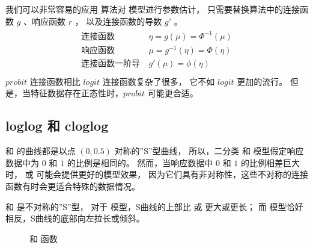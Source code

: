 \documentclass[letterpaper,10pt,english]{sphinxmanual}
\begin{document}
我们可以非常容易的应用  算法对  模型进行参数估计，
只需要替换算法中的连接函数 \(g\) 、响应函数 \(r\) ，
以及连接函数的导数 \(g'\) 。
\begin{align}\label{equation:二项模型/content:二项模型/content:46}\!\begin{aligned}
\text{连接函数} &\ \eta = g(\mu) = \Phi^{-1}(\mu)\\
\text{响应函数} &\ \mu = g^{-1}(\eta) = \Phi(\eta)\\
\text{连接函数一阶导} &\ g'(\mu) = \phi(\eta)\\
\end{aligned}\end{align}
\(probit\) 连接函数相比 \(logit\) 连接函数复杂了很多，
它不如 \(logit\) 更加的流行。
但是，当特征数据存在正态性时，\(probit\) 可能更合适。


\subsection{log\sphinxhyphen{}log 和 clog\sphinxhyphen{}log}
\label{\detokenize{_u4e8c_u9879_u6a21_u578b/content:log-log-clog-log}}
 和  的曲线都是以点 \((0,0.5)\) 对称的”S”型曲线，
所以，二分类  和  模型假定响应数据中为 \(0\) 和 \(1\) 的比例是相同的。
然而，当响应数据中 \(0\) 和 \(1\) 的比例相差巨大时，
 或  可能会提供更好的模型效果，
因为它们具有非对称性，这些不对称的连接函数有时会更适合特殊的数据情况。

 和  是不对称的”S”型，
对于  模型，S曲线的上部比  或  更大或更长；
而  模型恰好相反，S曲线的底部向左拉长或倾斜。

\begin{figure}[htbp]
\centering
\capstart

\noindent{}
\caption{ 和  函数}\label{\detokenize{_u4e8c_u9879_u6a21_u578b/content:id14}}\label{\detokenize{_u4e8c_u9879_u6a21_u578b/content:fg-binomial-04}}\end{figure}
\end{document}
